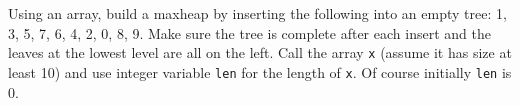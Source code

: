   Using an array, 
  build a maxheap by inserting the following into an empty tree:
  1, 3, 5, 7, 6, 4, 2, 0, 8, 9.
  Make sure the tree is complete after each insert and the leaves
  at the lowest level are all on the left.
  Call the array \texttt{x}
  (assume it has size at least 10)
  and use integer variable \texttt{len}
  for the length of \texttt{x}.
  Of course initially \texttt{len} is 0.
